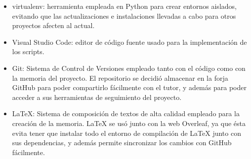 \begin{itemize}
    \item virtualenv: herramienta empleada en Python para crear entornos aislados, evitando que las actualizaciones e instalaciones llevadas a cabo para otros proyectos afecten al actual.
    \item Visual Studio Code: editor de código fuente usado para la implementación de los scripts.
    \item Git: Sistema de Control de Versiones empleado tanto con el código como con la memoria del proyecto. El repositorio se decidió almacenar en la forja GitHub para poder compartirlo fácilmente con el tutor, y además para poder acceder a sus herramientas de seguimiento del proyecto.
    \item \LaTeX: Sistema de composición de textos de alta calidad empleado para la creación de la memoria. LaTeX se usó junto con la web Overleaf, ya que ésta evita tener que instalar todo el entorno de compilación de LaTeX junto con sus dependencias, y además permite sincronizar los cambios con GitHub fácilmente.
\end{itemize}
